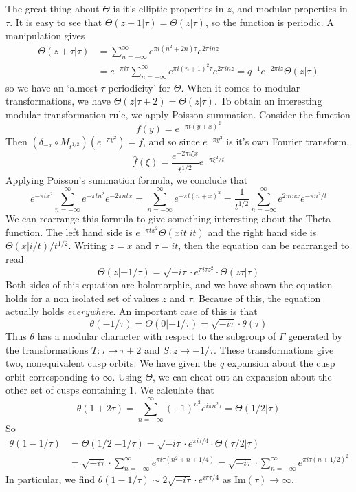 \documentclass{article}
\theoremstyle{plain}
\theoremstyle{remark}
\theoremstyle{definition}
\begin{document}
The great thing about $\Theta$ is it's elliptic properties in $z$, and modular properties in $\tau$. It is easy to see that $\Theta(z + 1|\tau) = \Theta(z|\tau)$, so the function is periodic. A manipulation gives
%
\begin{align*}
    \Theta(z+ \tau|\tau) &= \sum_{n = -\infty}^\infty e^{\pi i (n^2 + 2n) \tau} e^{2 \pi i n z}\\
    &= e^{-\pi i \tau} \sum_{n = -\infty}^\infty e^{\pi i (n+1)^2 \tau} e^{2 \pi i n z} = q^{-1} e^{-2 \pi i z} \Theta(z|\tau)
\end{align*}
%
so we have an `almost $\tau$ periodicity' for $\Theta$. When it comes to modular transformations, we have $\Theta(z|\tau + 2) = \Theta(z|\tau)$. To obtain an interesting modular transformation rule, we apply Poisson summation. Consider the function
%
\[ f(y) = e^{- \pi t(y + x)^2} \]
%
Then $(\delta_{-x} \circ M_{t^{1/2}})(e^{- \pi y^2}) = f$, and so since $e^{- \pi y^2}$ is it's own Fourier transform,
%
\[ \widehat{f}(\xi) = \frac{e^{- 2 \pi i \xi x}}{t^{1/2}} e^{- \pi \xi^2/t} \]
%
Applying Poisson's summation formula, we conclude that
%
\[ e^{- \pi t x^2} \sum_{n = -\infty}^\infty e^{- \pi t n^2} e^{- 2 \pi n t x} = \sum_{n = -\infty}^\infty e^{- \pi t(n + x)^2} = \frac{1}{t^{1/2}} \sum_{n = -\infty}^\infty e^{2 \pi i n x} e^{-\pi n^2/t} \]
%
We can rearrange this formula to give something interesting about the Theta function. The left hand side is $e^{- \pi t x^2} \Theta(xit|it)$ and the right hand side is $\Theta(x|i/t)/t^{1/2}$. Writing $z = x$ and $\tau = it$, then the equation can be rearranged to read
%
\[ \Theta(z|-1/\tau) = \sqrt{-i\tau} \cdot e^{\pi i \tau z^2} \cdot \Theta(z \tau | \tau) \]
%
Both sides of this equation are holomorphic, and we have shown the equation holds for a non isolated set of values $z$ and $\tau$. Because of this, the equation actually holds {\it everywhere}. An important case of this is that
%
\[ \theta(-1/\tau) = \Theta(0|-1/\tau) = \sqrt{-i\tau} \cdot \theta(\tau) \]
%
Thus $\theta$ has a modular character with respect to the subgroup of $\Gamma$ generated by the transformations $T: \tau \mapsto \tau + 2$ and $S: z \mapsto -1/\tau$. These transformations give two, nonequivalent cusp orbits. We have given the $q$ expansion about the cusp orbit corresponding to $\infty$. Using $\Theta$, we can cheat out an expansion about the other set of cusps containing 1. We calculate that
%
\[ \theta(1 + 2 \tau) = \sum_{n = -\infty}^\infty (-1)^{n^2} e^{i \pi n^2 \tau} = \Theta(1/2|\tau) \]
%
So
%
\begin{align*}
    \theta(1 - 1/\tau) &= \Theta(1/2|-1/\tau) = \sqrt{-i\tau} \cdot e^{\pi i \tau/4} \cdot \Theta(\tau/2 | \tau)\\
    &= \sqrt{-i\tau} \cdot \sum_{n = -\infty}^\infty e^{\pi i \tau(n^2 + n + 1/4)} = \sqrt{-i\tau} \cdot \sum_{n = -\infty}^\infty e^{\pi i \tau(n + 1/2)^2}
\end{align*}
%
In particular, we find $\theta(1 - 1/\tau) \sim 2 \sqrt{-i\tau} \cdot e^{i \pi \tau/4}$ as $\text{Im}(\tau) \to \infty$.
\end{document}
